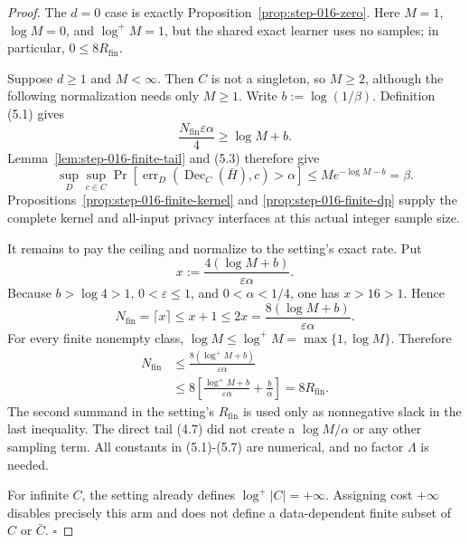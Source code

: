 \begin{proof}
The \(d=0\) case is exactly
Proposition~\ref{prop:step-016-zero}. Here \(M=1\), \(\log M=0\), and
\(\log^+M=1\), but the shared exact learner uses no samples; in particular,
\(0\le8R_{\mathrm{fin}}\).

Suppose \(d\ge1\) and \(M<\infty\). Then \(C\) is not a singleton, so
\(M\ge2\), although the following normalization needs only \(M\ge1\).
Write \(b:=\log(1/\beta)\). Definition (5.1) gives
\[
\frac{N_{\mathrm{fin}}\varepsilon\alpha}{4}
\ge\log M+b.
\tag{5.3}
\]
Lemma~\ref{lem:step-016-finite-tail} and (5.3) therefore give
\[
\sup_D\sup_{c\in C}
\Pr[\operatorname{err}_D(\operatorname{Dec}_C(\bar H),c)>\alpha]
\le M e^{-\log M-b}=\beta.
\tag{5.4}
\]
Propositions~\ref{prop:step-016-finite-kernel} and
\ref{prop:step-016-finite-dp} supply the complete kernel and all-input
privacy interfaces at this actual integer sample size.

It remains to pay the ceiling and normalize to the setting's exact rate. Put
\[
x:=\frac{4(\log M+b)}{\varepsilon\alpha}.
\tag{5.5}
\]
Because \(b>\log4>1\), \(0<\varepsilon\le1\), and
\(0<\alpha<1/4\), one has \(x>16>1\). Hence
\[
N_{\mathrm{fin}}=\lceil x\rceil
\le x+1\le2x
=\frac{8(\log M+b)}{\varepsilon\alpha}.
\tag{5.6}
\]
For every finite nonempty class,
\(\log M\le\log^+M=\max\{1,\log M\}\). Therefore
\[
\begin{aligned}
N_{\mathrm{fin}}
&\le\frac{8(\log^+M+b)}{\varepsilon\alpha}\\
&\le8\left[
\frac{\log^+M+b}{\varepsilon\alpha}+\frac b\alpha
\right]
=8R_{\mathrm{fin}}.
\end{aligned}
\tag{5.7}
\]
The second summand in the setting's \(R_{\mathrm{fin}}\) is used only as
nonnegative slack in the last inequality. The direct tail (4.7) did not
create a \(\log M/\alpha\) or any other sampling term. All constants in
(5.1)-(5.7) are numerical, and no factor \(\Lambda\) is needed.

For infinite \(C\), the setting already defines \(\log^+|C|=+\infty\).
Assigning cost \(+\infty\) disables precisely this arm and does not define a
data-dependent finite subset of \(C\) or \(\bar C\). \(\square\)


\end{proof}

